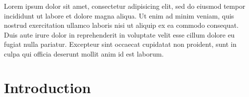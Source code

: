 \documentclass{scrbook}
\begin{document}
	Lorem ipsum dolor sit amet, consectetur adipisicing elit, sed do eiusmod
	tempor incididunt ut labore et dolore magna aliqua. Ut enim ad minim veniam,
	quis nostrud exercitation ullamco laboris nisi ut aliquip ex ea commodo
	consequat. Duis aute irure dolor in reprehenderit in voluptate velit esse
	cillum dolore eu fugiat nulla pariatur. Excepteur sint occaecat cupidatat non
	proident, sunt in culpa qui officia deserunt mollit anim id est laborum.

	\chapter[Intro]{Introduction} %
	\label{cha:introduction}
	
	\newpage

	


\end{document}
